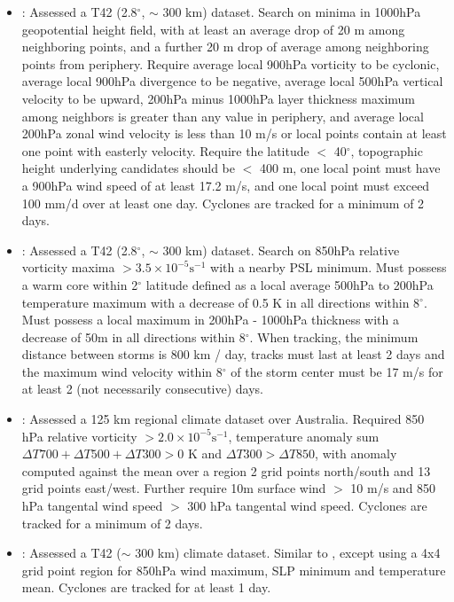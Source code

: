\documentclass[gmdd, hvmath, online]{copernicus_discussions}
\begin{document}
\begin{itemize}
\item \cite{tsutsui1996simulated}:  Assessed a T42 (2.8$^\circ$, $\sim$ 300 km) dataset.  Search on minima in 1000hPa geopotential height field, with at least an average drop of 20 m among neighboring points, and a further 20 m drop of average among neighboring points from periphery.  Require average local 900hPa vorticity to be cyclonic, average local 900hPa divergence to be negative, average local 500hPa vertical velocity to be upward, 200hPa minus 1000hPa layer thickness maximum among neighbors is greater than any value in periphery, and average local 200hPa zonal wind velocity is less than 10 m/s or local points contain at least one point with easterly velocity.  Require the latitude $<$ 40$^\circ$, topographic height underlying candidates should be $<$ 400 m, one local point must have a 900hPa wind speed of at least 17.2 m/s, and one local point must exceed 100 mm/d over at least one day.  Cyclones are tracked for a minimum of 2 days.

\item \cite{vitart1997simulation, vitart1999impact, vitart2001sensitivity, vitart2003mozambique}:  Assessed a T42 (2.8$^\circ$, $\sim$ 300 km) dataset.  Search on 850hPa relative vorticity maxima $> 3.5 \times 10^{-5} \mbox{s}^{-1}$ with a nearby PSL minimum.  Must possess a warm core within 2$^\circ$ latitude defined as a local average 500hPa to 200hPa temperature maximum with a decrease of 0.5 K in all directions within 8$^\circ$.  Must possess a local maximum in 200hPa - 1000hPa thickness with a decrease of 50m in all directions within 8$^\circ$.  When tracking, the minimum distance between storms is 800 km / day, tracks must last at least 2 days and the maximum wind velocity within 8$^\circ$ of the storm center must be 17 m/s for at least 2 (not necessarily consecutive) days.

\item \cite{walsh1997objective, walsh1997tropical, walsh2000impact}:  Assessed a 125 km regional climate dataset over Australia.  Required 850 hPa relative vorticity $> 2.0 \times 10^{-5} \mbox{s}^{-1}$, temperature anomaly sum $\Delta T700+ \Delta T500+ \Delta T300 > 0$ K and $\Delta T300 > \Delta T850$, with anomaly computed against the mean over a region 2 grid points north/south and 13 grid points east/west.  Further require 10m surface wind $>$ 10 m/s and 850 hPa tangental wind speed $>$ 300 hPa tangental wind speed.  Cyclones are tracked for a minimum of 2 days.

\item \cite{krishnamurti1998impact}:  Assessed a T42 ($\sim$ 300 km) climate dataset.  Similar to \cite{bengtsson1995hurricane, bengtsson1996will}, except using a 4x4 grid point region for 850hPa wind maximum, SLP minimum and temperature mean.  Cyclones are tracked for at least 1 day.


\end{itemize}
\end{document}
